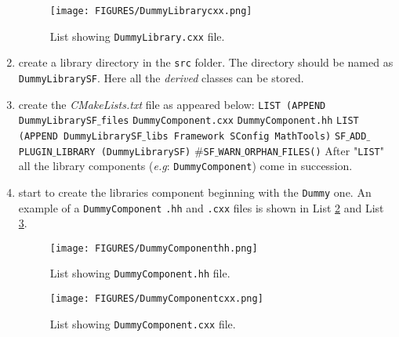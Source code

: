 \documentclass[11pt,a4paper,oneside]{article}
\begin{document}
\begin{enumerate}
{\begin{figure}[htp]
\center
\texttt{[image: FIGURES/DummyLibrarycxx.png]}
\caption{List showing \texttt{DummyLibrary.cxx} file.} \label{fig:dummy library cxx}
\end{figure}
}
\item{create a library directory in the \texttt{src} folder. The directory should be named as \texttt{DummyLibrarySF}. Here all the \textit{derived} classes can be stored.
}
\item{create the \textit{CMakeLists.txt} file as appeared below:
\newline
\newline
\hspace*{0.8cm}
\texttt{LIST (APPEND DummyLibrarySF$\_$files}
\newline
\hspace*{0.8cm}
\texttt{DummyComponent.cxx}
\newline
\hspace*{0.8cm}
\texttt{DummyComponent.hh}
\newline
\newline
\hspace*{0.8cm}
\texttt{LIST (APPEND DummyLibrarySF$\_$libs Framework SConfig MathTools)}
\newline
\newline
\hspace*{0.8cm}
\texttt{SF$\_$ADD$\_$PLUGIN$\_$LIBRARY (DummyLibrarySF)}
\newline
\newline
\hspace*{0.8cm}
\texttt{$\#$SF$\_$WARN$\_$ORPHAN$\_$FILES()}
\newline
\newline
After "\texttt{LIST}" all the library components (\textit{e.g}: \texttt{DummyComponent}) come in succession.
}
\item{start to create the libraries component beginning with the \texttt{Dummy} one. An example of a \texttt{DummyComponent} \texttt{.hh} and \texttt{.cxx} files is shown in List \ref{fig:dummy component hh} and List \ref{fig:dummy component cxx}.

\begin{figure}[htp]
\center
\texttt{[image: FIGURES/DummyComponenthh.png]}
\caption{List showing \texttt{DummyComponent.hh} file.} \label{fig:dummy component hh}
\end{figure}

\begin{figure}[htp]
\center
\texttt{[image: FIGURES/DummyComponentcxx.png]}
\caption{List showing \texttt{DummyComponent.cxx} file.} \label{fig:dummy component cxx}
\end{figure}

}
\end{enumerate}
\end{document}
